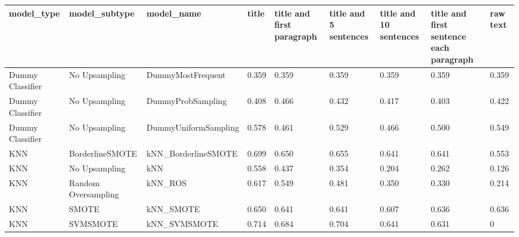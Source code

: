 \begin{tabular}{lllllllll}
\toprule
                  model\_type &       model\_subtype &                                   model\_name & title & title and first paragraph & title and 5 sentences & title and 10 sentences & title and first sentence each paragraph &  raw text \\
\midrule
            Dummy Classifier &       No Upsampling &                            DummyMostFrequent & 0.359 &                     0.359 &                 0.359 &                  0.359 &                                   0.359 &     0.359 \\
            Dummy Classifier &       No Upsampling &                            DummyProbSampling & 0.408 &                     0.466 &                 0.432 &                  0.417 &                                   0.403 &     0.422 \\
            Dummy Classifier &       No Upsampling &                         DummyUniformSampling & 0.578 &                     0.461 &                 0.529 &                  0.466 &                                   0.500 &     0.549 \\
                         KNN &     BorderlineSMOTE &                          kNN\_BorderlineSMOTE & 0.699 &                     0.650 &                 0.655 &                  0.641 &                                   0.641 &     0.553 \\
                         KNN &       No Upsampling &                                          kNN & 0.558 &                     0.437 &                 0.354 &                  0.204 &                                   0.262 &     0.126 \\
                         KNN & Random Oversampling &                                      kNN\_ROS & 0.617 &                     0.549 &                 0.481 &                  0.350 &                                   0.330 &     0.214 \\
                         KNN &               SMOTE &                                    kNN\_SMOTE & 0.650 &                     0.641 &                 0.641 &                  0.607 &                                   0.636 &     0.636 \\
                         KNN &            SVMSMOTE &                                 kNN\_SVMSMOTE & 0.714 &                     0.684 &                 0.704 &                  0.641 &                                   0.631 &         0 \\

\end{tabular}
